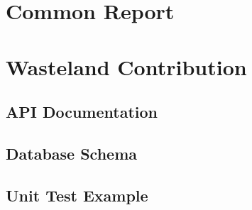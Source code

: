 




\pagestyle{empty}


\cleardoublepage


\cleardoublepage



\cleardoublepage
{}
\tableofcontents
\cleardoublepage
\pagestyle{plain}

\part{Common Report}

\part{Wasteland Contribution}










\cleardoublepage
\begin{appendices}
\chapter{API Documentation}\label{app:api}
  
  
  
  
  
\chapter{Database Schema}\label{app:database}
  
\chapter{Unit Test Example}\label{app:unit_test}
  
\end{appendices}
\cleardoublepage
{}




